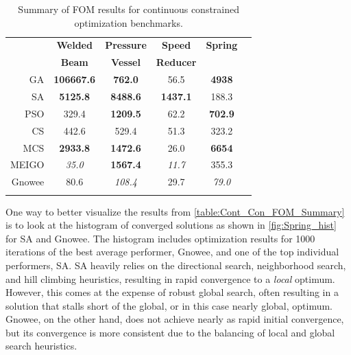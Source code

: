 \documentclass{article}                                                                           %
\begin{document}
\begin{table}[!]
\centering
\caption{Summary of FOM results for continuous constrained optimization benchmarks.} 
\label{table:Cont_Con_FOM_Summary}
\begin{tabular}{r c c c c c }
\toprule
\textbf{} & \textbf{Welded} & \textbf{Pressure} & \textbf{Speed} & \textbf{Spring} \\
& \textbf{Beam \cite{Cagnina2008}} & \textbf{Vessel \cite{Cagnina2008}} & \textbf{Reducer \cite{Cagnina2008}} & \textbf{ \cite{Cagnina2008}}  \\
\midrule
GA\cite{Mathworks2015} & \textbf{106667.6} & \textbf{762.0} & 56.5 & \textbf{4938} \\ \addlinespace
SA\cite{Mathworks2015} & \textbf{5125.8} & \textbf{8488.6} & \textbf{1437.1} & 188.3 \\ \addlinespace
PSO\cite{Mathworks2015} & 329.4 & \textbf{1209.5} & 62.2 & \textbf{702.9}\\ \addlinespace
CS\cite{Yang2014} & 442.6 & 529.4 & 51.3 & 323.2 \\ \addlinespace
MCS\cite{Walton2011} & \textbf{2933.8} & \textbf{1472.6} & 26.0 & \textbf{6654}\\ \addlinespace
MEIGO\cite{Egea2014} & \textit{35.0} & \textbf{1567.4} & \textit{11.7} & 355.3 \\ \addlinespace
Gnowee & 80.6 & \textit{108.4} & 29.7 & \textit{79.0} \\ \addlinespace
\bottomrule
\end{tabular}
\end{table}

One way to better visualize the results from \autoref{table:Cont_Con_FOM_Summary} is to look at the histogram of converged solutions as shown in \autoref{fig:Spring_hist} for SA and Gnowee.
The histogram includes optimization results for 1000 iterations of the best average performer, Gnowee, and one of the top individual performers, SA.
SA heavily relies on the directional search, neighborhood search, and hill climbing heuristics, resulting in rapid convergence to a \textit{local} optimum.
However, this comes at the expense of robust global search, often resulting in a solution that stalls short of the global, or in this case nearly global, optimum.  
Gnowee, on the other hand, does not achieve nearly as rapid initial convergence, but its convergence is more consistent due to the balancing of local and global search heuristics.  
\end{document}
